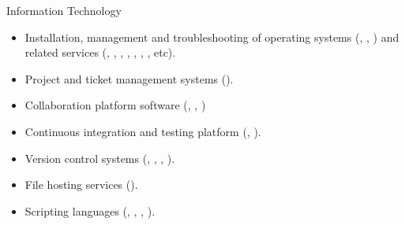 \vspace{-2.5em}



\begin{cvskills}

\cvskill
{Information Technology}
{
\begin{minipage}{0.48\textwidth}
\vspace{0.3em}
\begin{itemize}[labelwidth=\the\widest,align=right,leftmargin=!,labelsep=1pt,noitemsep]
\item[\custItem] Installation, management and troubleshooting of
operating systems (\textsc{\color{awesome}{Linux/Unix}},
\textsc{\color{awesome}{Windows}}, \textsc{\color{awesome}{MacOS}}) and
related services (\textsc{\color{awesome}{ssh}}, \textsc{\color{awesome}{ftp}},
\textsc{\color{awesome}{nfs}}, \textsc{\color{awesome}{vpn}}, \textsc{\color{awesome}{dhcp}},
\textsc{\color{awesome}{dns}}, \textsc{\color{awesome}{Apache}}, etc).
\item[\custItem] Project and ticket management systems (\textsc{\color{awesome}{JIRA}}).
\item[\custItem] Collaboration platform software (\textsc{\color{awesome}{twiki}},
\textsc{\color{awesome}{wiki}}, \textsc{\color{awesome}{Confluence}})
\item[\custItem] Continuous integration and testing platform
(\textsc{\color{awesome}{Bamboo}}, \textsc{\color{awesome}{Jenkins}}).
\item[\custItem] Version control systems (\textsc{\color{awesome}{Git}},
\textsc{\color{awesome}{GitLab}}, \textsc{\color{awesome}{svn}},
\textsc{\color{awesome}{cvs}}).
\item[\custItem] File hosting services (\textsc{\color{awesome}{Nextcloud}}).
\item[\custItem] Scripting languages (\textsc{\color{awesome}{bash}},
\textsc{\color{awesome}{sh}}, \textsc{\color{awesome}{ksh}},
\textsc{\color{awesome}{csh}}).
\end{itemize}
\end{minipage}
}
\end{cvskills}
